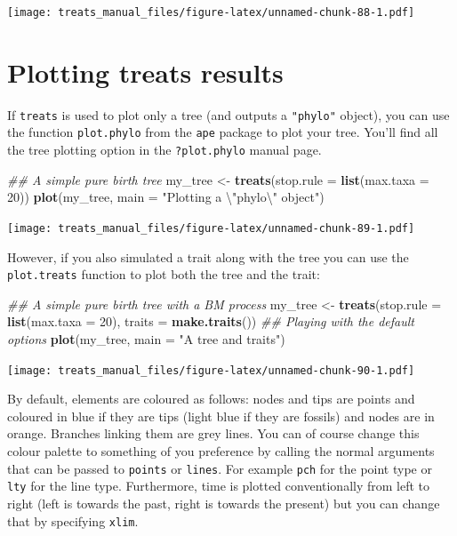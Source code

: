 \documentclass[
]{book}
\newenvironment{Shaded}{\begin{snugshade}}{\end{snugshade}}
\newcommand{\CharTok}[1]{\textcolor[rgb]{0.31,0.60,0.02}{#1}}
\newcommand{\CommentTok}[1]{\textcolor[rgb]{0.56,0.35,0.01}{\textit{#1}}}
\newcommand{\DataTypeTok}[1]{\textcolor[rgb]{0.13,0.29,0.53}{#1}}
\newcommand{\DecValTok}[1]{\textcolor[rgb]{0.00,0.00,0.81}{#1}}
\newcommand{\KeywordTok}[1]{\textcolor[rgb]{0.13,0.29,0.53}{\textbf{#1}}}
\newcommand{\NormalTok}[1]{#1}
\newcommand{\StringTok}[1]{\textcolor[rgb]{0.31,0.60,0.02}{#1}}
\begin{document}
\texttt{[image: treats\_manual\_files/figure-latex/unnamed-chunk-88-1.pdf]}

\hypertarget{plotting-treats-results}{%
\chapter{Plotting treats results}\label{plotting-treats-results}}

If \texttt{treats} is used to plot only a tree (and outputs a \texttt{"phylo"} object), you can use the function \texttt{plot.phylo} from the \texttt{ape} package to plot your tree.
You'll find all the tree plotting option in the \texttt{?plot.phylo} manual page.

\begin{Shaded}
\begin{Highlighting}[]
\CommentTok{\#\# A simple pure birth tree}
\NormalTok{my\_tree \textless{}{-}}\StringTok{ }\KeywordTok{treats}\NormalTok{(}\DataTypeTok{stop.rule =} \KeywordTok{list}\NormalTok{(}\DataTypeTok{max.taxa =} \DecValTok{20}\NormalTok{))}
\KeywordTok{plot}\NormalTok{(my\_tree, }\DataTypeTok{main =} \StringTok{"Plotting a }\CharTok{\textbackslash{}"}\StringTok{phylo}\CharTok{\textbackslash{}"}\StringTok{ object"}\NormalTok{)}
\end{Highlighting}
\end{Shaded}

\texttt{[image: treats\_manual\_files/figure-latex/unnamed-chunk-89-1.pdf]}

However, if you also simulated a trait along with the tree you can use the \texttt{plot.treats} function to plot both the tree and the trait:

\begin{Shaded}
\begin{Highlighting}[]
\CommentTok{\#\# A simple pure birth tree with a BM process}
\NormalTok{my\_tree \textless{}{-}}\StringTok{ }\KeywordTok{treats}\NormalTok{(}\DataTypeTok{stop.rule =} \KeywordTok{list}\NormalTok{(}\DataTypeTok{max.taxa =} \DecValTok{20}\NormalTok{), }\DataTypeTok{traits =} \KeywordTok{make.traits}\NormalTok{())}
\CommentTok{\#\# Playing with the default options}
\KeywordTok{plot}\NormalTok{(my\_tree, }\DataTypeTok{main =} \StringTok{"A tree and traits"}\NormalTok{)}
\end{Highlighting}
\end{Shaded}

\texttt{[image: treats\_manual\_files/figure-latex/unnamed-chunk-90-1.pdf]}

By default, elements are coloured as follows: nodes and tips are points and coloured in blue if they are tips (light blue if they are fossils) and nodes are in orange.
Branches linking them are grey lines.
You can of course change this colour palette to something of you preference by calling the normal arguments that can be passed to \texttt{points} or \texttt{lines}. For example \texttt{pch} for the point type or \texttt{lty} for the line type.
Furthermore, time is plotted conventionally from left to right (left is towards the past, right is towards the present) but you can change that by specifying \texttt{xlim}.
\end{document}
